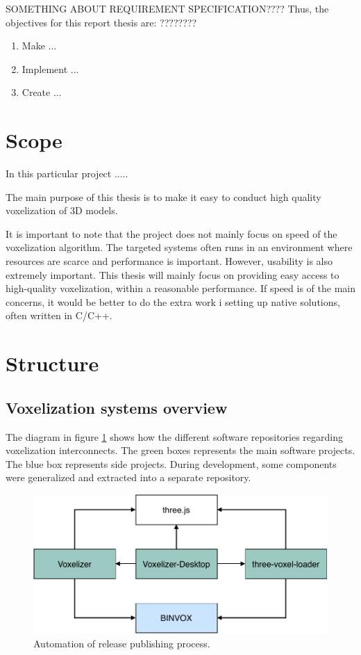 SOMETHING ABOUT REQUIREMENT SPECIFICATION????
Thus, the objectives for this report thesis are: ????????
\begin{enumerate}
\item Make ...
\item Implement ...
\item Create ...
\end{enumerate}

\section{Scope}
In this particular project .....  

The main purpose of this thesis is to make it easy to conduct high quality voxelization of 3D models. 

It is important to note that the project does not mainly focus on speed of the voxelization algorithm. The targeted systems often runs in an environment where resources are scarce and performance is important. However, usability is also extremely important. This thesis will mainly focus on providing easy access to high-quality voxelization, within a reasonable performance. If speed is of the main concerns, it would be better to do the extra work i setting up native solutions, often written in C/C++.



\section{Structure}
\subsection{Voxelization systems overview}
The diagram in figure \ref{fig:systems-overview} shows how the different software repositories regarding voxelization interconnects. The green boxes represents the main software projects. The blue box represents side projects. During development, some components were generalized and extracted into a separate repository.
\begin{figure}[h]
    \centering
    \includegraphics[page=1,scale=1]{sections/introduction/figures/systems-overview.pdf}
    \caption{Automation of release publishing process.}
    \label{fig:systems-overview}
\end{figure}

